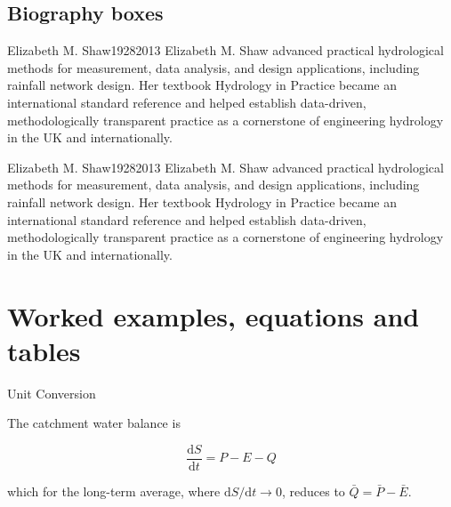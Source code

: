 \lipsum[19-20]


\subsection{Biography boxes}

\begin{boxbio}{Elizabeth M. Shaw}{1928}{2013}
\tcblower
Elizabeth M. Shaw advanced practical hydrological methods for measurement, data analysis, and design applications, including rainfall network design. Her textbook Hydrology in Practice became an international standard reference and helped establish data-driven, methodologically transparent practice as a cornerstone of engineering hydrology in the UK and internationally.
\end{boxbio}

\lipsum[32-40]

\lipsum[32-40]

\begin{boxbio}{Elizabeth M. Shaw}{1928}{2013}
\tcblower
Elizabeth M. Shaw advanced practical hydrological methods for measurement, data analysis, and design applications, including rainfall network design. Her textbook Hydrology in Practice became an international standard reference and helped establish data-driven, methodologically transparent practice as a cornerstone of engineering hydrology in the UK and internationally.
\end{boxbio}


\section{Worked examples, equations and tables}

\begin{workedexample}{Unit Conversion}
 \lipsum[34]

 The catchment water balance is

\begin{equation}
\frac{\mathrm{d}S}{\mathrm{d}t} = P - E - Q
\label{eq:mock-wb}
\end{equation}

which for the long-term average, where $\mathrm{d}S/\mathrm{d}t \to 0$,
reduces to $\bar{Q} = \bar{P} - \bar{E}$.
\end{workedexample}

